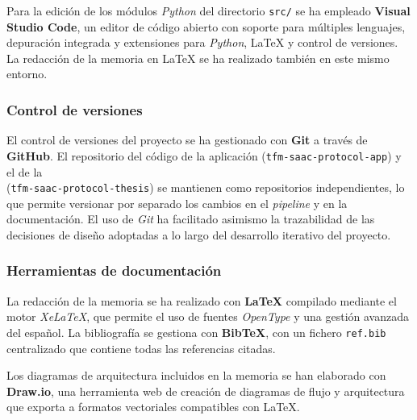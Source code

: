 Para la edición de los módulos \emph{Python} del directorio \texttt{src/} se ha
empleado \textbf{Visual Studio Code}, un editor de código abierto con soporte para
múltiples lenguajes, depuración integrada y extensiones para \emph{Python},
\LaTeX{} y control de versiones. La redacción de la memoria en \LaTeX{} se ha
realizado también en este mismo entorno.


\subsubsection{Control de versiones}

El control de versiones del proyecto se ha gestionado con \textbf{Git} a través de
\textbf{GitHub}. El repositorio del código de la aplicación
(\texttt{tfm-saac-protocol-app}) y el de la \\ (\texttt{tfm-saac-protocol-thesis})
se mantienen como repositorios independientes, lo que permite versionar por separado
los cambios en el \emph{pipeline} y en la documentación. El uso de \emph{Git} ha
facilitado asimismo la trazabilidad de las decisiones de diseño adoptadas a lo largo
del desarrollo iterativo del proyecto.


\subsubsection{Herramientas de documentación}

La redacción de la memoria se ha realizado con \textbf{\LaTeX{}} compilado mediante
el motor \emph{XeLaTeX}, que permite el uso de fuentes \emph{OpenType} y una gestión
avanzada del español. La bibliografía se gestiona con \textbf{Bib\TeX{}}, con un
fichero \texttt{ref.bib} centralizado que contiene todas las referencias citadas.

Los diagramas de arquitectura incluidos en la memoria se han elaborado con
\textbf{Draw.io}, una herramienta web de creación de diagramas de flujo y arquitectura
que exporta a formatos vectoriales compatibles con \LaTeX{}.



